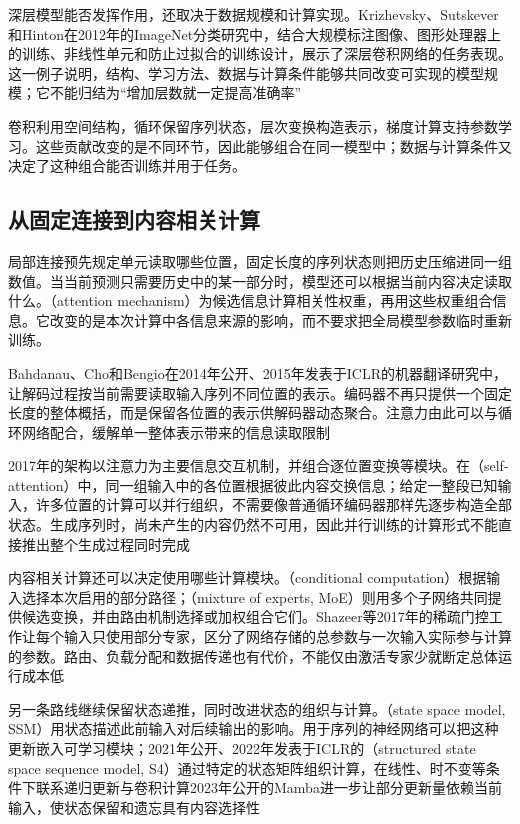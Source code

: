 深层模型能否发挥作用，还取决于数据规模和计算实现。Krizhevsky、Sutskever和Hinton在2012年的ImageNet分类研究中，结合大规模标注图像、图形处理器上的训练、非线性单元和防止过拟合的训练设计，展示了深层卷积网络的任务表现。这一例子说明，结构、学习方法、数据与计算条件能够共同改变可实现的模型规模；它不能归结为“增加层数就一定提高准确率”

卷积利用空间结构，循环保留序列状态，层次变换构造表示，梯度计算支持参数学习。这些贡献改变的是不同环节，因此能够组合在同一模型中；数据与计算条件又决定了这种组合能否训练并用于任务。

\subsection{从固定连接到内容相关计算}
\label{sec:neural-history-content-dependent}

局部连接预先规定单元读取哪些位置，固定长度的序列状态则把历史压缩进同一组数值。当当前预测只需要历史中的某一部分时，模型还可以根据当前内容决定读取什么。（attention mechanism）为候选信息计算相关性权重，再用这些权重组合信息。它改变的是本次计算中各信息来源的影响，而不要求把全局模型参数临时重新训练。

Bahdanau、Cho和Bengio在2014年公开、2015年发表于ICLR的机器翻译研究中，让解码过程按当前需要读取输入序列不同位置的表示。编码器不再只提供一个固定长度的整体概括，而是保留各位置的表示供解码器动态聚合。注意力由此可以与循环网络配合，缓解单一整体表示带来的信息读取限制

2017年的架构以注意力为主要信息交互机制，并组合逐位置变换等模块。在（self-attention）中，同一组输入中的各位置根据彼此内容交换信息；给定一整段已知输入，许多位置的计算可以并行组织，不需要像普通循环编码器那样先逐步构造全部状态。生成序列时，尚未产生的内容仍然不可用，因此并行训练的计算形式不能直接推出整个生成过程同时完成

内容相关计算还可以决定使用哪些计算模块。（conditional computation）根据输入选择本次启用的部分路径；（mixture of experts, MoE）则用多个子网络共同提供候选变换，并由路由机制选择或加权组合它们。Shazeer等2017年的稀疏门控工作让每个输入只使用部分专家，区分了网络存储的总参数与一次输入实际参与计算的参数。路由、负载分配和数据传递也有代价，不能仅由激活专家少就断定总体运行成本低

另一条路线继续保留状态递推，同时改进状态的组织与计算。（state space model, SSM）用状态描述此前输入对后续输出的影响。用于序列的神经网络可以把这种更新嵌入可学习模块；2021年公开、2022年发表于ICLR的（structured state space sequence model, S4）通过特定的状态矩阵组织计算，在线性、时不变等条件下联系递归更新与卷积计算2023年公开的Mamba进一步让部分更新量依赖当前输入，使状态保留和遗忘具有内容选择性

